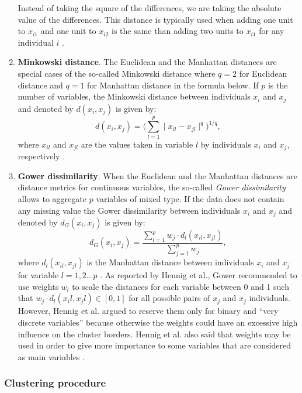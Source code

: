 \begin{enumerate}
Instead of taking the square of the differences, we are taking the absolute value of the differences. This distance is typically used when adding one unit to $x_{i1}$ and one unit to $x_{i2}$ is the same than adding two units to $x_{i1}$ for any individual $i$ \cite{kaufman_finding_1990}.
\item \textbf{Minkowski distance}. The Euclidean and the Manhattan distances are special cases of the so-called Minkowski distance where $q=2$ for Euclidean distance and $q=1$ for Manhattan distance in the formula below. If $p$ is the number of variables, the Minkowski distance between individuals $x_i$ and $x_j$ and denoted by $d(x_i,x_j)$ is given by:
\begin{equation*}
d(x_i,x_j)= \Big ( \sum_{l=1}^p \mid x_{il} - x_{jl} \mid^q \Big )^{1/q},
\end{equation*}
where $x_{il}$ and $x_{jl}$ are the values taken in variable $l$ by individuals $x_i$ and $x_j$, respectively \cite{hennig_handbook_2016}.
\item \textbf{Gower dissimilarity}. When the Euclidean and the Manhattan distances are distance metrics for continuous variables, the so-called \emph{Gower dissimilarity} allows to aggregate $p$ variables of mixed type. If the data does not contain any missing value the Gower dissimilarity between individuals $x_i$ and $x_j$ and denoted by  $d_G(x_i,x_j)$ is given by:
\begin{equation*}
d_G(x_i,x_j) = \frac{\sum_{l=1}^p w_j \cdot d_l(x_{il},x_{jl})}{\sum_{j=1}^p w_j},
\end{equation*}
where $d_l(x_{il},x_{jl})$ is the Manhattan distance between individuals $x_i$ and $x_j$ for variable $l=1,2\dots p$ \cite{hennig_handbook_2016}. As reported by Hennig et al., Gower recommended to use weights $w_l$ to scale the distances for each variable between 0 and 1 such that $w_j\cdot d_l(x_il,x_jl) \in [0,1]$ for all possible pairs of $x_j$ and $x_j$ individuals. However, Hennig et al. argued to reserve them only for binary and ``very discrete variables'' because otherwise the weights could have an excessive high influence on the cluster borders. Hennig et al. also said that weights may be used in order to give more importance to some variables that are considered as main variables \cite{hennig_handbook_2016}.
\end{enumerate}

\subsubsection{Clustering procedure}

